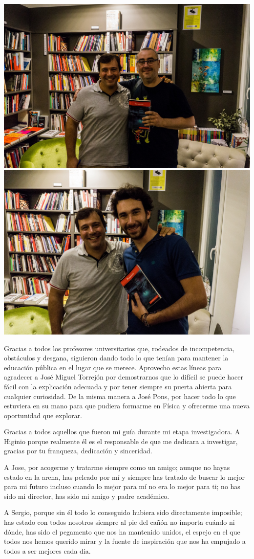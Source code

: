 \begin{center}
\includegraphics[width=0.45\linewidth]{Figures/Ack/valle}
\includegraphics[width=0.45\linewidth]{Figures/Ack/valle2}
\end{center}

Gracias a todos los profesores universitarios que, rodeados de incompetencia, obstáculos y desgana, siguieron dando todo lo que tenían para mantener la educación pública en el lugar que se merece. Aprovecho estas líneas para agradecer a José Miguel Torrejón por demostrarnos que lo difícil se puede hacer fácil con la explicación adecuada y por tener siempre su puerta abierta para cualquier curiosidad. De la misma manera a José Pons, por hacer todo lo que estuviera en su mano para que pudiera formarme en Física y ofrecerme una nueva oportunidad que explorar.

Gracias a todos aquellos que fueron mi guía durante mi etapa investigadora. A Higinio porque realmente él es el responsable de que me dedicara a investigar, gracias por tu franqueza, dedicación y sinceridad.

A Jose, por acogerme y tratarme siempre como un amigo; aunque no hayas estado en la arena, has peleado por mí y siempre has tratado de buscar lo mejor para mi futuro incluso cuando lo mejor para mí no era lo mejor para ti; no has sido mi director, has sido mi amigo y padre académico.

A Sergio, porque sin él todo lo conseguido hubiera sido directamente imposible; has estado con todos nosotros siempre al pie del cañón no importa cuándo ni dónde, has sido el pegamento que nos ha mantenido unidos, el espejo en el que todos nos hemos querido mirar y la fuente de inspiración que nos ha empujado a todos a ser mejores cada día.

